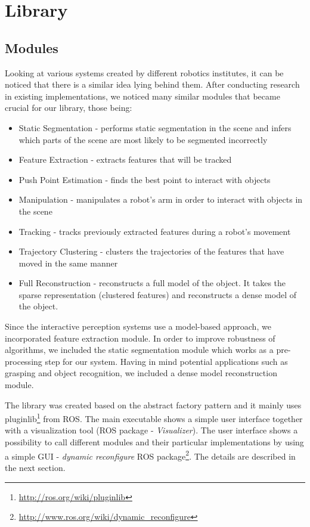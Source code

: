 \section{Library}
\subsection{Modules}
Looking at various systems created by different robotics institutes, %
it can be noticed that there is a similar idea lying behind them. After conducting research in existing implementations, we noticed many similar modules that became crucial for our library, those being:

\begin{itemize}
\item Static Segmentation - performs static segmentation in the scene and infers which parts of the scene are most likely to be segmented incorrectly
\item Feature Extraction - extracts features that will be tracked
\item Push Point Estimation - finds the best point to interact with objects
\item Manipulation - manipulates a robot's arm in order to interact with objects in the scene
\item Tracking - tracks previously extracted features during a robot's movement
\item Trajectory Clustering - clusters the trajectories of the features that have moved in the same manner
\item Full Reconstruction - reconstructs a full model of the object. It takes the sparse representation (clustered features) and reconstructs a dense model of the object.
\end{itemize}

Since the interactive perception systems use a model-based approach, we incorporated feature extraction module. In order to improve robustness of algorithms, we included the static segmentation module which works as a pre-processing step for our system. Having in mind potential applications such as grasping and object recognition, we included a dense model reconstruction module.

The library was created based on the abstract factory pattern and it mainly uses pluginlib\footnote{\url{http://ros.org/wiki/pluginlib}} from ROS. The main executable shows a simple user interface together with a visualization tool (ROS package - \textit{Visualizer}). The user interface shows a possibility to call different modules and their particular implementations by using a simple GUI - \textit{dynamic reconfigure} ROS package\footnote{\url{http://www.ros.org/wiki/dynamic_reconfigure}}. The details are described in the next section.

